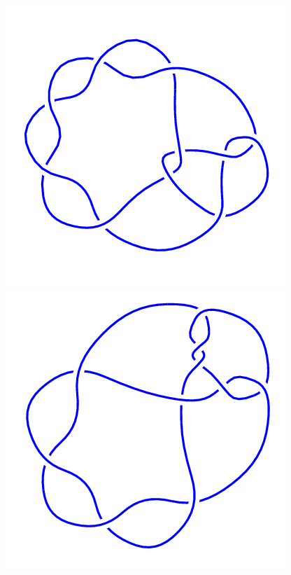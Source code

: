 \begin{figure}[H]
	\begin{minipage}[b]{.18\linewidth}
		\centering
		\includegraphics[width=\linewidth]{../data/10_47.png}
	\end{minipage}
	\begin{minipage}[b]{.18\linewidth}
		\centering
		\includegraphics[width=\linewidth]{../data/10_48.png}

\end{minipage}
\end{figure}
